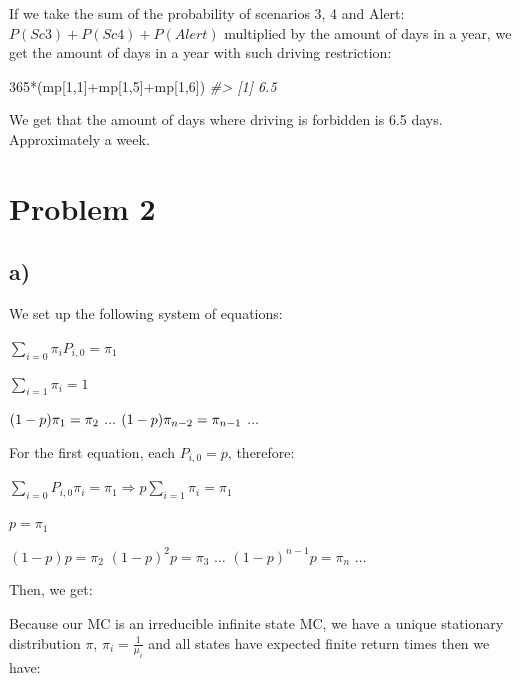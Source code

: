 \documentclass[
]{article}
\newenvironment{Shaded}{\begin{snugshade}}{\end{snugshade}}
\newcommand{\CommentTok}[1]{\textcolor[rgb]{0.56,0.35,0.01}{\textit{#1}}}
\newcommand{\DecValTok}[1]{\textcolor[rgb]{0.00,0.00,0.81}{#1}}
\newcommand{\NormalTok}[1]{#1}
\newcommand{\SpecialCharTok}[1]{\textcolor[rgb]{0.00,0.00,0.00}{#1}}
\begin{document}
If we take the sum of the probability of scenarios 3, 4 and Alert:
\(P(Sc3) + P(Sc4) + P(Alert)\) multiplied by the amount of days in a
year, we get the amount of days in a year with such driving restriction:

\begin{Shaded}
\begin{Highlighting}[]
\DecValTok{365}\SpecialCharTok{*}\NormalTok{(mp[}\DecValTok{1}\NormalTok{,}\DecValTok{1}\NormalTok{]}\SpecialCharTok{+}\NormalTok{mp[}\DecValTok{1}\NormalTok{,}\DecValTok{5}\NormalTok{]}\SpecialCharTok{+}\NormalTok{mp[}\DecValTok{1}\NormalTok{,}\DecValTok{6}\NormalTok{])}
\CommentTok{\#\textgreater{} [1] 6.5}
\end{Highlighting}
\end{Shaded}

We get that the amount of days where driving is forbidden is 6.5 days.
Approximately a week.

\newpage

\hypertarget{problem-2}{%
\section{Problem 2}\label{problem-2}}

\hypertarget{a-1}{%
\subsection{a)}\label{a-1}}

We set up the following system of equations:

\(\sum_{i=0} \pi_{i} P_{i,0} = \pi_{1}\)

\(\sum_{i=1} \pi_{i} = 1\)

\((1 - p) \pi_{1} = \pi_{2}\\\) \(\dots\)
\((1 - p) \pi_{n-2} = \pi_{n-1}\\\) \(\dots\)

For the first equation, each \(P_{i,0} = p\), therefore:

\(\sum_{i=0} P_{i,0} \pi_{i} = \pi_{1} \Rightarrow p \sum_{i=1} \pi_{i} = \pi_{1}\)

\(p = \pi_{1}\)

\((1 - p)p = \pi_{2}\) \((1 - p)^{2} p = \pi_{3}\) \(\dots\)
\((1 - p)^{n-1} p = \pi_{n}\) \(\dots\)

Then, we get:

Because our MC is an irreducible infinite state MC, we have a unique
stationary distribution \(\pi\), \(\pi_{i} = \frac{1}{\mu_{i}}\) and all
states have expected finite return times then we have:
\end{document}

